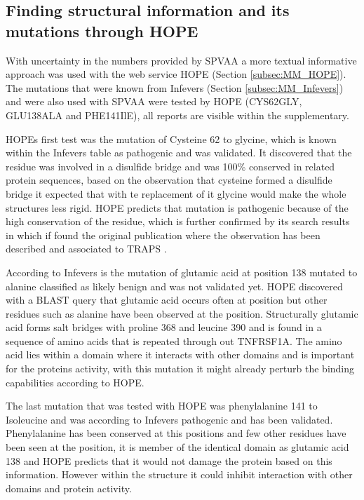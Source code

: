 \newpage
	
\newpage	
\subsection{Finding structural information and its mutations through HOPE}
	With uncertainty in the numbers provided by SPVAA a more textual informative approach was used with the web service HOPE (Section \ref{subsec:MM_HOPE}). The mutations that were known from Infevers (Section \ref{subsec:MM_Infevers}) and were also used with SPVAA were tested by HOPE (CYS62GLY, GLU138ALA and PHE141IlE), all reports are visible within the supplementary.
	
	HOPEs first test was the mutation of Cysteine 62 to glycine, which is known within the Infevers table as pathogenic and was validated. It discovered that the residue was involved in a disulfide bridge and was 100\% conserved in related protein sequences, based on the observation that cysteine formed a disulfide bridge it expected that with te replacement of it glycine would make the whole structures less rigid. HOPE predicts that mutation is pathogenic because of the high conservation of the residue, which is further confirmed by its search results in which if found the original publication where the observation has been described and associated to TRAPS \cite{}.
	
	According to Infevers is the mutation of glutamic acid at position 138 mutated to alanine classified as likely benign and was not validated yet. HOPE discovered with a BLAST query that glutamic acid occurs often at position but other residues such as alanine have been observed at the position. Structurally glutamic acid forms salt bridges with proline  368 and leucine 390 and is found in a sequence of amino acids that is repeated through out TNFRSF1A. The amino acid lies within a domain where it interacts with other domains and is important for the proteins activity, with this mutation it might already perturb the binding capabilities according to HOPE.
	
	The last mutation that was tested with HOPE was phenylalanine 141 to Isoleucine and was according to Infevers pathogenic and has been validated. Phenylalanine has been conserved at this positions and few other residues have been seen at the position, it is member of the identical domain as glutamic acid 138 and HOPE predicts that it would not damage the protein based on this information. However within the structure it could inhibit interaction with other domains and protein activity.
	
